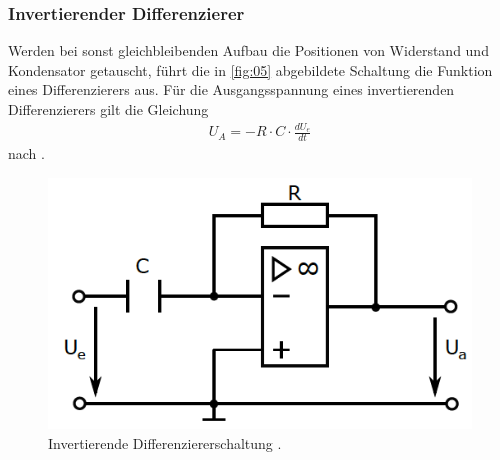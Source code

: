 \subsubsection{Invertierender Differenzierer}
\noindent Werden bei sonst gleichbleibenden Aufbau die Positionen von Widerstand
und Kondensator getauscht, führt die in \autoref{fig:05} abgebildete Schaltung
die Funktion eines Differenzierers aus. Für die Ausgangsspannung eines
invertierenden Differenzierers gilt die Gleichung
\begin{align}
  U_A = - R \cdot C \cdot \frac{d U_e}{dt}
  \label{eqn:08}
\end{align}
nach \cite{osnabrueck}.
\begin{figure}
  \centering
  \includegraphics[scale=0.5]{ressources/figure_05.png}
  \caption{Invertierende Differenziererschaltung \cite{sample}.}
  \label{fig:05}
\end{figure}
